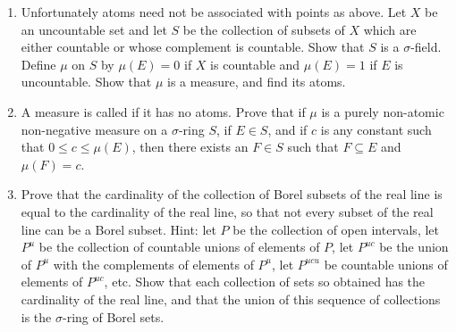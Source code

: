 \begin{enumerate}[label=\arabic*),ref=\arabic*]
\item Unfortunately atoms need not be associated with points as above. Let ${X}$ be an uncountable set and let ${S}$ be the collection of subsets of ${X}$ which are either countable or whose complement is countable. Show that ${S}$ is a $\sigma$-field. Define $\mu$ on ${S}$ by $\mu(E)=0$ if ${X}$ is countable and $\mu(E)=1$ if $E$ is uncountable. Show that $\mu$ is a measure, and find its atoms.

\item\label{exer:non atomic measure}
A measure is called  if it has no atoms. Prove that if $\mu$ is a purely non-atomic non-negative measure on a $\sigma$-ring $S$, if $E \in S$, and if $c$ is any constant such that $0 \leq c\leq \mu(E)$, then there exists an $F \in S$ such that $F \subseteq E$ and $\mu(F)=c$.

\item\label{exer:construct borel for reals}
Prove that the cardinality of the collection of Borel subsets of the real line is equal to the cardinality of the real line, so that not every subset of the real line can be a Borel subset. Hint: let $P$ be the collection of open intervals, let $P^u$ be the collection of countable unions of elements of $P$, let $P^{uc}$ be the union of $P^u$ with the complements of elements of $P^u$, let $P^{ucu}$ be countable unions of elements of $P^{uc}$, etc. Show that each collection of sets so obtained has the cardinality of the real line, and that the union of this sequence of collections is the $\sigma$-ring of Borel sets.


\end{enumerate}
